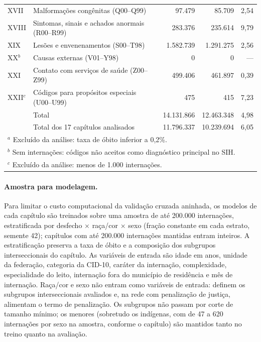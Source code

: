 \begin{table}[htbp]
\begin{tabular}{llrrr}
    XVII  & Malformações congênitas (Q00--Q99)                  &    97.479 &    85.709 &  2,54 \\
    XVIII & Sintomas, sinais e achados anormais (R00--R99)      &   283.376 &   235.614 &  9,79 \\
    XIX   & Lesões e envenenamentos (S00--T98)                  & 1.582.739 & 1.291.275 &  2,56 \\
    XX$^{b}$ & Causas externas (V01--Y98)                       &         0 &         0 &   --- \\
    XXI   & Contato com serviços de saúde (Z00--Z99)            &   499.406 &   461.897 &  0,39 \\
    XXII$^{c}$ & Códigos para propósitos especiais (U00--U99)   &       475 &       415 &  7,23 \\
    \midrule
          & Total                                               & 14.131.866 & 12.463.348 & 4,98 \\
          & Total dos 17 capítulos analisados                   & 11.796.337 & 10.239.694 & 6,05 \\
    \bottomrule
    \multicolumn{5}{l}{\footnotesize $^{a}$ Excluído da análise: taxa de óbito inferior a 0,2\%.} \\
    \multicolumn{5}{l}{\footnotesize $^{b}$ Sem internações: códigos não aceitos como diagnóstico principal no SIH.} \\
    \multicolumn{5}{l}{\footnotesize $^{c}$ Excluído da análise: menos de 1.000 internações.} \\
  \end{tabular}
\end{table}

\paragraph{Amostra para modelagem.}
Para limitar o custo computacional da validação cruzada aninhada, os modelos
de cada capítulo são treinados sobre uma amostra de até 200.000 internações,
estratificada por desfecho $\times$ raça/cor $\times$ sexo (fração constante
em cada estrato, semente 42); capítulos com até 200.000 internações mantidas
entram inteiros. A estratificação preserva a taxa de óbito e a composição dos
subgrupos interseccionais do capítulo. As variáveis de entrada são idade em
anos, unidade da federação, categoria da CID-10, caráter da internação,
complexidade, especialidade do leito, internação fora do município de
residência e mês de internação. Raça/cor e sexo não entram como variáveis de
entrada: definem os subgrupos interseccionais avaliados e, na rede com
penalização de justiça, alimentam o termo de penalização. Os subgrupos não
passam por corte de tamanho mínimo; os menores (sobretudo os indígenas, com
de 47 a 620 internações por sexo na amostra, conforme o capítulo)
são mantidos tanto no treino quanto na avaliação.

